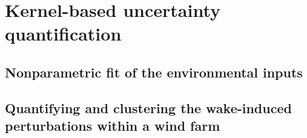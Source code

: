 \chapter{Kernel-based uncertainty quantification}
    \section{Nonparametric fit of the environmental inputs }
    \section{Quantifying and clustering the wake-induced perturbations within a wind farm }
